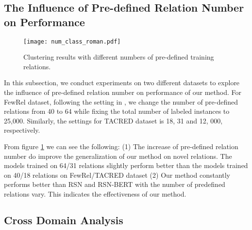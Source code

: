 \documentclass[11pt]{article}
\begin{document}
    \subsection{The Influence of Pre-defined Relation Number on Performance}
        \begin{figure}[t]
            \texttt{[image: num\_class\_roman.pdf]}
            \caption{Clustering results with different numbers of pre-defined training relations.}
            \label{fig:num_class}
        \end{figure}
        In this subsection, we conduct experiments on two different datasets to explore the influence of pre-defined relation number on performance of our method. For FewRel dataset, following the setting in \citep{wu-etal-2019-open}, we change the number of pre-defined relations from 40 to 64 while fixing the total number of labeled instances to 25,000. Similarly, the settings for TACRED dataset is 18, 31 and 12, 000, respectively.


From figure \ref{fig:num_class} we can see the following: (1) The increase of pre-defined relation number do improve the generalization of our method on novel relations. The models trained on 64/31 relations slightly perform better than the models trained on 40/18 relations on FewRel/TACRED dataset (2) Our method constantly performs better than RSN and RSN-BERT with the number of predefined relations vary. This indicates the effectiveness of our method.
        
    \subsection{Cross Domain Analysis}
        \begin{table}
            \centering
            \caption{\label{tab:cross_res}
            Results on two constructed cross-domain tasks. F means FewRel, which is from encyclopedia domain. T means TACRED, which is from news and web domain. This table only lists the results of metric . For results of other metrics, please refer to the Table \ref{tab:det_cro} in Appendix \ref{app:other}.}
        \end{table}   
        
\end{document}
